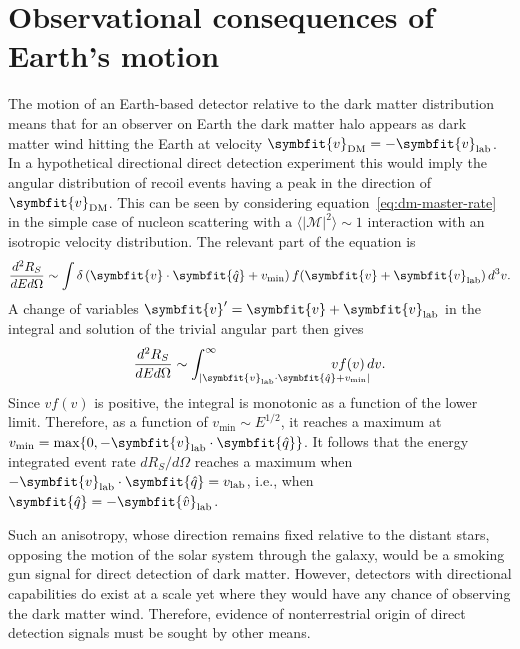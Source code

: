 \documentclass[b5paper, 10pt, twoside]{book}
\renewcommand{\vec}[1]{\symbfit{#1}}
\newcommand{\ddder}[3]{\frac{d^2#1}{d#2d#3}}
\newcommand{\unitv}[1]{\symbfit{\hat{#1}}}
\newcommand{\difd}{\,d}
\newcommand{\tmean}[1]{\langle#1\rangle}
\begin{document}
\section{Observational consequences of Earth's motion}

The motion of an Earth-based detector relative to the dark matter distribution means that for an observer on Earth the dark matter halo appears as dark matter wind hitting the Earth at velocity $\vec{v}_\text{DM}=-\vec{v}_\text{lab}$. In a hypothetical directional direct detection experiment this would imply the angular distribution of recoil events having a peak in the direction of $\vec{v}_\text{DM}$. This can be seen by considering equation~\eqref{eq:dm-master-rate} in the simple case of nucleon scattering with a $\tmean{|\mathcal{M}|^2}\sim 1$ interaction with an isotropic velocity distribution. The relevant part of the equation is
\begin{equation}
    \ddder{R_S}{E}{\Omega}\sim\int\delta\left(\vec{v}\cdot\unitv{q}+v_\text{min}\right)f(\vec{v}+\vec{v}_\text{lab})\difd^3v.
\end{equation}
A change of variables $\vec{v}'=\vec{v}+\vec{v}_\text{lab}$ in the integral and solution of the trivial angular part then gives
\begin{equation}
    \ddder{R_S}{E}{\Omega}\sim\int_{|\vec{v}_\text{lab}\cdot\unitv{q}+v_\text{min}|}^\infty\hspace{-3em}vf(v)\difd v.
    \label{eq:isotropic-rate}
\end{equation}
Since $vf(v)$ is positive, the integral is monotonic as a function of the lower limit. Therefore, as a function of $v_\text{min}\sim E^{1/2}$, it reaches a maximum at $v_\text{min}=\max\{0,-\vec{v}_\text{lab}\cdot\unitv{q}\}$. It follows that the energy integrated event rate $dR_S/d\Omega$ reaches a maximum when $-\vec{v}_\text{lab}\cdot\unitv{q}=v_\text{lab}$, i.e., when $\unitv{q}=-\unitv{v}_\text{lab}$.

Such an anisotropy, whose direction remains fixed relative to the distant stars, opposing the motion of the solar system through the galaxy, would be a smoking gun signal for direct detection of dark matter. However, detectors with directional capabilities do exist at a scale yet where they would have any chance of observing the dark matter wind. Therefore, evidence of nonterrestrial origin of direct detection signals must be sought by other means.
\end{document}
